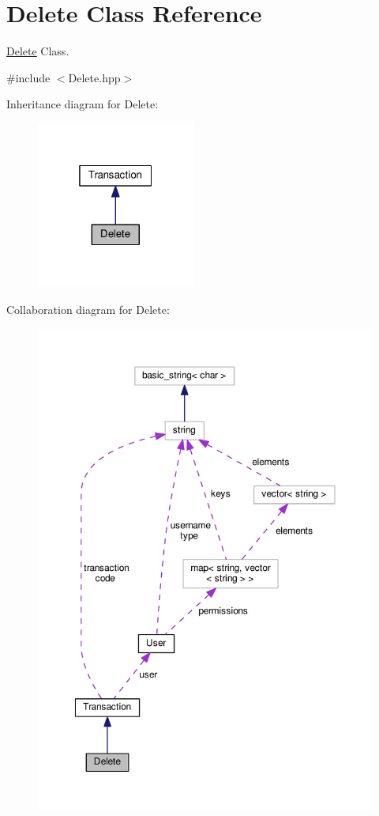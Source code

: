 \hypertarget{class_delete}{\section{Delete Class Reference}
\label{class_delete}
}


\hyperlink{class_delete}{Delete} Class.  




{\ttfamily \#include $<$Delete.\-hpp$>$}



Inheritance diagram for Delete\-:\nopagebreak
\begin{figure}[H]
\begin{center}
\leavevmode
\includegraphics[width=148pt]{class_delete__inherit__graph}
\end{center}
\end{figure}


Collaboration diagram for Delete\-:\nopagebreak
\begin{figure}[H]
\begin{center}
\leavevmode
\includegraphics[width=350pt]{class_delete__coll__graph}
\end{center}
\end{figure}
